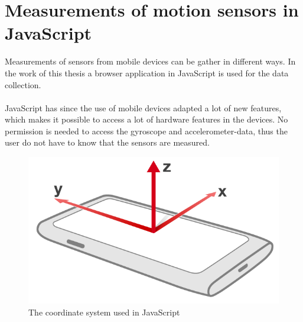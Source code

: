 \section{Measurements of motion sensors in JavaScript}\label{sec:charMeasureSensor}
Measurements of sensors from mobile devices can be gather in different ways. In the work of this thesis a browser application in JavaScript is used for the data collection. \\
\\
JavaScript has since the use of mobile devices adapted a lot of new features, which makes it possible to access a lot of hardware features in the devices. No permission is needed to access the gyroscope and accelerometer-data, thus the user do not have to know that the sensors are measured.
\begin{figure}[H]
  \centering
    \includegraphics[scale=0.2]{img/device-axes}
    \caption{The coordinate system used in JavaScript\cite[]{sensor:W3C}}
  \label{fig:device-axes}
\end{figure}

